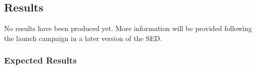 \subsection{Results}

No results have been produced yet. More information will be provided following the launch campaign in a later version of the SED.

\subsubsection{Expected Results}
\label{sec:ExpectedResults}
